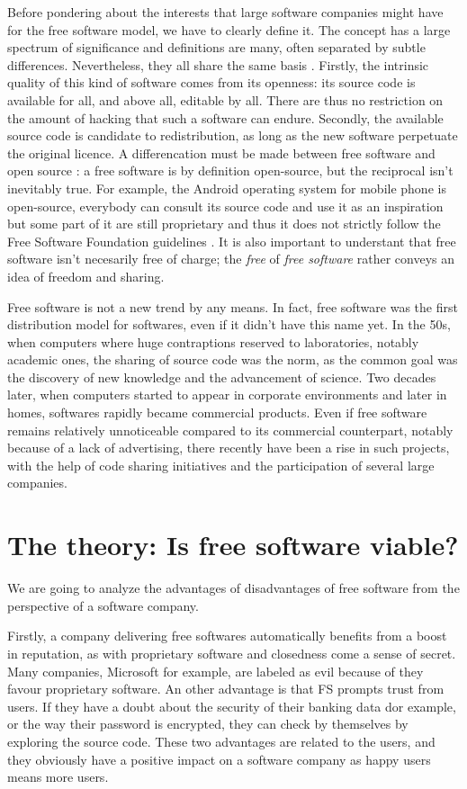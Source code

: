 \documentclass[12pt]{article}
\begin{document}
Before pondering about the interests that large software companies
might have for the free software model, we have to clearly define
it. The concept has a large spectrum of significance and definitions
are many, often separated by subtle differences. Nevertheless, they
all share the same basis \cite{sers}. Firstly, the intrinsic quality
of this kind of software comes from its openness: its source code is
available for all, and above all, editable by all. There are thus no
restriction on the amount of hacking that such a software can
endure. Secondly, the available source code is candidate to
redistribution, as long as the new software perpetuate the original
licence. A differencation must be made between free software and open
source : a free software is by definition open-source, but the
reciprocal isn't inevitably true. For example, the Android operating
system for mobile phone is open-source, everybody can consult its
source code and use it as an inspiration but some part of it are still
proprietary and thus it does not strictly follow the Free Software
Foundation guidelines \cite{and}. It is also important to understant
that free software isn't necesarily free of charge; the \textit{free}
of \textit{free software} rather conveys an idea of freedom and
sharing.

Free software is not a new trend by any means. In fact, free software
was the first distribution model for softwares, even if it didn't have
this name yet. In the 50s, when computers where huge contraptions
reserved to laboratories, notably academic ones, the sharing of source
code was the norm, as the common goal was the discovery of new
knowledge and the advancement of science. Two decades later, when
computers started to appear in corporate environments and later in
homes, softwares rapidly became commercial products. Even if free
software remains relatively unnoticeable compared to its commercial
counterpart, notably because of a lack of advertising, there recently
have been a rise in such projects, with the help of code sharing
initiatives and the participation of several large companies.

\section{The theory: Is free software viable?}

We are going to analyze the advantages of disadvantages of free
software from the perspective of a software company.

Firstly, a company delivering free softwares automatically benefits
from a boost in reputation, as with proprietary software and
closedness come a sense of secret. Many companies, Microsoft for
example, are labeled as evil because of they favour proprietary
software. An other advantage is that FS prompts trust from users. If
they have a doubt about the security of their banking data dor
example, or the way their password is encrypted, they can check by
themselves by exploring the source code. These two advantages are
related to the users, and they obviously have a positive impact on a
software company as happy users means more users.
\end{document}
